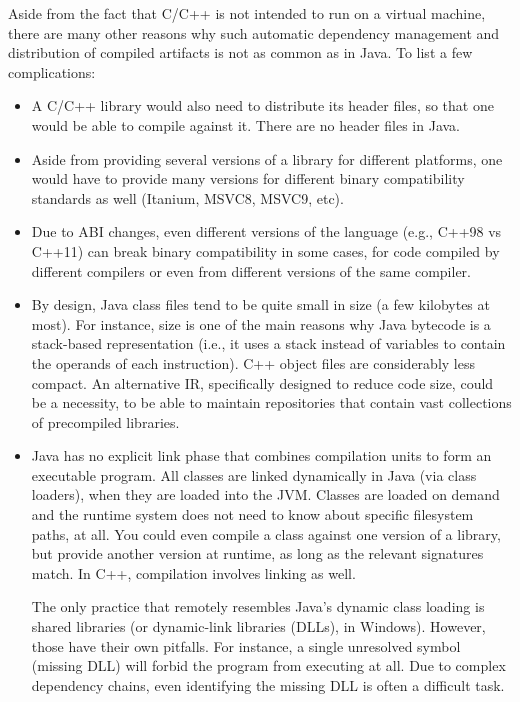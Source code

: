 Aside from the fact that C/C++ is not intended to run on a virtual
machine, there are many other reasons why such automatic dependency
management and distribution of compiled artifacts is not as common as
in Java. To list a few complications:
\begin{itemize}[--]
\item A C/C++ library would also need to distribute its header files,
  so that one would be able to compile against it. There are no header
  files in Java.
\item Aside from providing several versions of a library for different
  platforms, one would have to provide many versions for different
  binary compatibility standards as well (Itanium, MSVC8, MSVC9, etc).
\item Due to ABI changes, even different versions of the language
  (e.g., C++98 vs C++11) can break binary compatibility in some cases,
  for code compiled by different compilers or even from different
  versions of the same compiler.
\item By design, Java class files tend to be quite small in size (a
  few kilobytes at most). For instance, size is one of the main
  reasons why Java bytecode is a stack-based representation (i.e., it
  uses a stack instead of variables to contain the operands of each
  instruction). C++ object files are considerably less compact. An
  alternative IR, specifically designed to reduce code size, could be
  a necessity, to be able to maintain repositories that contain vast
  collections of precompiled libraries.
\item Java has no explicit link phase that combines compilation units
  to form an executable program. All classes are linked dynamically in
  Java (via class loaders), when they are loaded into the JVM. Classes
  are loaded on demand and the runtime system does not need to know
  about specific filesystem paths, at all. You could even compile a
  class against one version of a library, but provide another version
  at runtime, as long as the relevant signatures match.  In C++,
  compilation involves linking as well.

  The only practice that remotely resembles Java's dynamic class
  loading is shared libraries (or dynamic-link libraries (DLLs), in
  Windows). However, those have their own pitfalls. For instance, a
  single unresolved symbol (missing DLL) will forbid the program from
  executing at all. Due to complex dependency chains, even identifying
  the missing DLL is often a difficult task.
\end{itemize}

